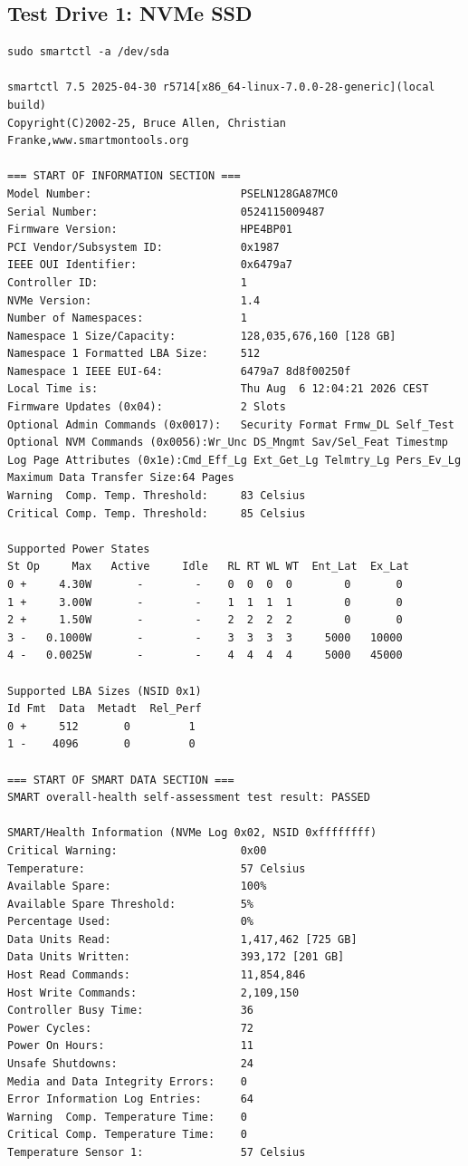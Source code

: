\subsection{Test Drive 1: NVMe SSD}
\begin{verbatim}
sudo smartctl -a /dev/sda

smartctl 7.5 2025-04-30 r5714[x86_64-linux-7.0.0-28-generic](local build)
Copyright(C)2002-25, Bruce Allen, Christian Franke,www.smartmontools.org

=== START OF INFORMATION SECTION ===
Model Number:                       PSELN128GA87MC0
Serial Number:                      0524115009487
Firmware Version:                   HPE4BP01
PCI Vendor/Subsystem ID:            0x1987
IEEE OUI Identifier:                0x6479a7
Controller ID:                      1
NVMe Version:                       1.4
Number of Namespaces:               1
Namespace 1 Size/Capacity:          128,035,676,160 [128 GB]
Namespace 1 Formatted LBA Size:     512
Namespace 1 IEEE EUI-64:            6479a7 8d8f00250f
Local Time is:                      Thu Aug  6 12:04:21 2026 CEST
Firmware Updates (0x04):            2 Slots
Optional Admin Commands (0x0017):   Security Format Frmw_DL Self_Test
Optional NVM Commands (0x0056):Wr_Unc DS_Mngmt Sav/Sel_Feat Timestmp
Log Page Attributes (0x1e):Cmd_Eff_Lg Ext_Get_Lg Telmtry_Lg Pers_Ev_Lg
Maximum Data Transfer Size:64 Pages
Warning  Comp. Temp. Threshold:     83 Celsius
Critical Comp. Temp. Threshold:     85 Celsius

Supported Power States
St Op     Max   Active     Idle   RL RT WL WT  Ent_Lat  Ex_Lat
0 +     4.30W       -        -    0  0  0  0        0       0
1 +     3.00W       -        -    1  1  1  1        0       0
2 +     1.50W       -        -    2  2  2  2        0       0
3 -   0.1000W       -        -    3  3  3  3     5000   10000
4 -   0.0025W       -        -    4  4  4  4     5000   45000

Supported LBA Sizes (NSID 0x1)
Id Fmt  Data  Metadt  Rel_Perf
0 +     512       0         1
1 -    4096       0         0

=== START OF SMART DATA SECTION ===
SMART overall-health self-assessment test result: PASSED

SMART/Health Information (NVMe Log 0x02, NSID 0xffffffff)
Critical Warning:                   0x00
Temperature:                        57 Celsius
Available Spare:                    100%
Available Spare Threshold:          5%
Percentage Used:                    0%
Data Units Read:                    1,417,462 [725 GB]
Data Units Written:                 393,172 [201 GB]
Host Read Commands:                 11,854,846
Host Write Commands:                2,109,150
Controller Busy Time:               36
Power Cycles:                       72
Power On Hours:                     11
Unsafe Shutdowns:                   24
Media and Data Integrity Errors:    0
Error Information Log Entries:      64
Warning  Comp. Temperature Time:    0
Critical Comp. Temperature Time:    0
Temperature Sensor 1:               57 Celsius
\end{verbatim}

